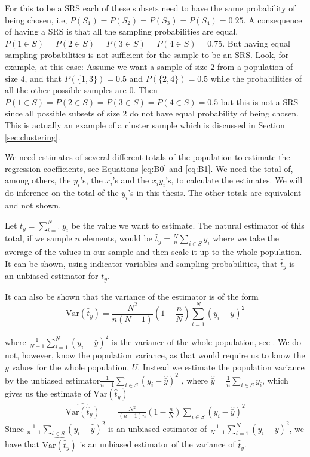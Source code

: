 \documentclass{article}
\begin{document}
For this to be a SRS each of these subsets need to have the same probability of
being chosen, i.e, \(P(S_1) = P(S_2) = P(S_3) = P(S_4) = 0.25\). A consequence of
having a SRS is that all the sampling probabilities are equal, \(P(1 \in S) =
P(2 \in S) = P(3 \in S) = P(4 \in S) = 0.75\). But having equal sampling
probabilities is not sufficient for the sample to be an SRS.
Look, for example, at this case:
Assume we want a sample of size \(2\) from a population of size \(4\), and that
\(P(\{1, 3\}) = 0.5\) and \(P(\{2, 4\}) = 0.5\) while the probabilities of all the
other possible samples are \(0\). Then \(P(1 \in S) = P(2 \in S) = P(3 \in S) = P(4 \in S) = 0.5\)
but this is not a SRS since all possible subsets of size \(2\) do not have equal
probability of being chosen. This is actually an example of a cluster sample
which is discussed in Section \ref{sec:clustering}.

We need estimates of several different totals of the population to estimate the
regression coefficients, see Equations \ref{eq:B0} and \ref{eq:B1}. We need the total of, among others, the \(y_i\)'s, the
\(x_i\)'s and the \(x_i y_i\)'s, to calculate the estimates.
We will do inference on the total of the \(y_i\)'s in this thesis. The other totals
are equivalent and not shown.

Let
\(
 t_y = \sum_{i = 1}^{N} y_i
\)
be the value we want to estimate.
The natural estimator of this total, if we sample \(n\) elements, would be
\(
\hat{t}_y = \frac{N}{n}\sum_{i \in S} y_i
\)
where we take the average of the values in our sample and then scale it up to
the whole population.
It can be shown, using indicator variables and sampling probabilities, that
\(\hat{t}_y\) is an unbiased estimator for \(t_y\).

It can also be shown that the variance of the estimator is of the form \begin{equation*}
\mathrm{Var} \left( \hat{t}_y \right) = \frac{N^2}{n \left( N - 1 \right)} \left( 1 - \frac{n}{N} \right) \sum_{i = 1}^N (y_i - \bar{y})^2 
\end{equation*}

where
\(
\frac{1}{N - 1} \sum_{i = 1}^N (y_i - \bar{y})^2
\)
is the variance of the whole population, see
\cite[Chapter 2]{sampReg}.
We do not, however, know the population variance, as that would require us to know the \(y\) values
for the whole population, \(U\). Instead we estimate the population variance by the unbiased estimator\(
 \frac{1}{n - 1} \sum_{i \in S} \left( y_i - \hat{\bar{y}} \right)^2
\)
, where \(\hat{\bar{y}} = \frac{1}{n} \sum_{i \in S} y_i \), which gives us the estimate of \(\mathrm{Var}(\hat{t}_y)\)\begin{align*}
 \widehat{\mathrm{Var}(\hat{t}_y)}
 &=\frac{N^2}{\left( n - 1 \right)n} \left( 1 - \frac{n}{N} \right) \sum_{i \in S} \left( y_i - \hat{\bar{y}} \right)^2
\end{align*}
Since \(\frac{1}{n - 1} \sum_{i \in S} \left( y_i - \hat{\bar{y}} \right)^2\) is
an unbiased estimator of \(\frac{1}{N - 1} \sum_{i = 1}^N (y_i - \bar{y})^2\), we have that \(\widehat{\mathrm{Var}(\hat{t}_y)}\) is an unbiased estimator of the variance of \(\hat{t}_y\).
\end{document}
